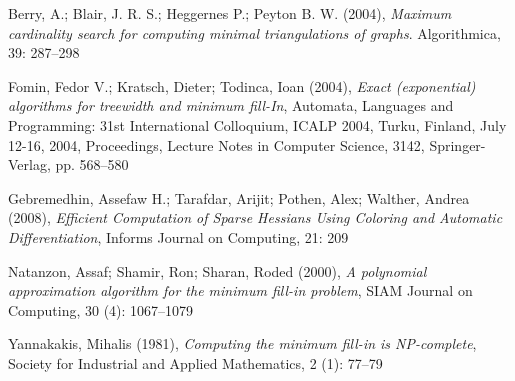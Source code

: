 \documentclass{article}
\begin{document}
\begin{thebibliography}{20}
Berry, A.; Blair, J. R. S.; Heggernes P.; Peyton B. W. (2004), \textit{Maximum cardinality search for computing minimal triangulations of graphs}.
Algorithmica, 39: 287–298

Fomin, Fedor V.; Kratsch, Dieter; Todinca, Ioan (2004), \textit{Exact (exponential) algorithms for treewidth and minimum fill-In}, Automata, Languages and Programming: 31st International Colloquium, ICALP 2004, Turku, Finland, July 12-16, 2004, Proceedings, Lecture Notes in Computer Science, 3142, Springer-Verlag, pp. 568–580

Gebremedhin, Assefaw H.; Tarafdar, Arijit; Pothen, Alex; Walther, Andrea (2008), \textit{Efficient Computation of Sparse Hessians Using Coloring and Automatic Differentiation}, Informs Journal on Computing, 21: 209

Natanzon, Assaf; Shamir, Ron; Sharan, Roded (2000), \textit{A polynomial approximation algorithm for the minimum fill-in problem}, SIAM Journal on Computing, 30 (4): 1067–1079

Yannakakis, Mihalis (1981), \textit{Computing the minimum fill-in is NP-complete}, Society for Industrial and Applied Mathematics, 2 (1): 77–79
\end{thebibliography}
\end{document}
